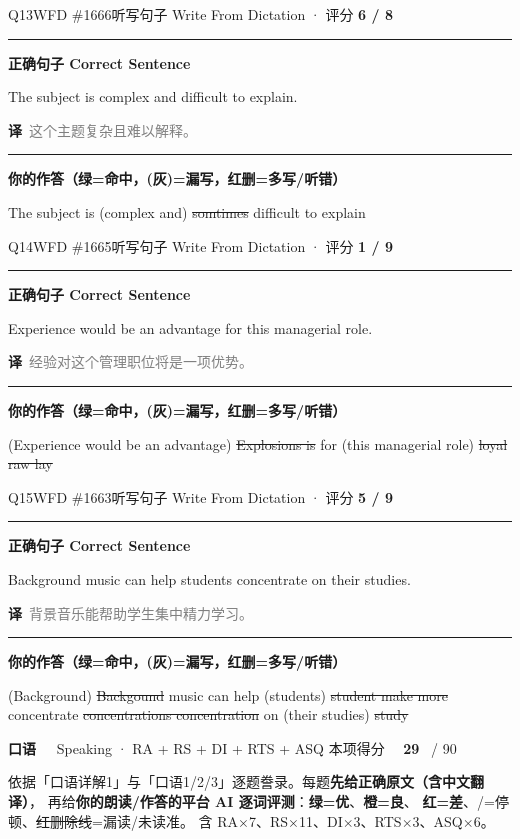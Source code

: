 \documentclass[11pt]{article}
\newcommand{\ptesub}[1]{%
  \par\needspace{2\baselineskip}\smallskip
  {\color{cAccent}\rule[-0.2ex]{3pt}{1.05em}}\hspace{6pt}%
  {\bfseries\color{cHead}#1}\par\nopagebreak\smallskip}
\newcommand{\ptesection}[3]{%
  \addcontentsline{toc}{section}{#1}%
  \needspace{6\baselineskip}
  \begin{tcolorbox}[enhanced, colback=cAccent, colframe=cAccent, sharp corners,
     left=14pt, right=14pt, top=10pt, bottom=10pt, boxrule=0pt]
    {\fontsize{20}{24}\selectfont\bfseries\color{white} #1\ \ }%
    {\large\color{white!85} #2}\hfill
    {\large\color{white}本项得分\ \ }{\fontsize{22}{24}\selectfont\bfseries\color{white} #3}%
    \ {\color{white!85}/ 90}
  \end{tcolorbox}}
\newcommand{\zh}[1]{{\footnotesize\textcolor{cNote}{\textbf{译}}\ \textcolor{gray}{#1}}}
\newcommand{\lhit}[1]{{\color{cFix}#1}}                           %
\newcommand{\lmiss}[1]{{\color{cWrong}\sout{#1}}}                 %
\begin{document}
\begin{qblock}{Q13\quad WFD \#1666}{听写句子 Write From Dictation · 评分 \textcolor{cAccent}{\bfseries 6 / 8}}
\ptesub{正确句子 Correct Sentence}
\begin{promptbox}
The subject is complex and difficult to explain.
\end{promptbox}
\zh{这个主题复杂且难以解释。}
\ptesub{你的作答（{\color{cFix}绿=命中}，{\color{gray}(灰)=漏写}，{\color{cWrong}红删=多写/听错}）}
{\small\lhit{The subject is} {\color{gray}(complex and)} \lmiss{somtimes} \lhit{difficult to explain}}
\end{qblock}

\begin{qblock}{Q14\quad WFD \#1665}{听写句子 Write From Dictation · 评分 \textcolor{cAccent}{\bfseries 1 / 9}}
\ptesub{正确句子 Correct Sentence}
\begin{promptbox}
Experience would be an advantage for this managerial role.
\end{promptbox}
\zh{经验对这个管理职位将是一项优势。}
\ptesub{你的作答（{\color{cFix}绿=命中}，{\color{gray}(灰)=漏写}，{\color{cWrong}红删=多写/听错}）}
{\small{\color{gray}(Experience would be an advantage)} \lmiss{Explosions is} \lhit{for} {\color{gray}(this managerial role)} \lmiss{loyal raw lay}}
\end{qblock}

\begin{qblock}{Q15\quad WFD \#1663}{听写句子 Write From Dictation · 评分 \textcolor{cAccent}{\bfseries 5 / 9}}
\ptesub{正确句子 Correct Sentence}
\begin{promptbox}
Background music can help students concentrate on their studies.
\end{promptbox}
\zh{背景音乐能帮助学生集中精力学习。}
\ptesub{你的作答（{\color{cFix}绿=命中}，{\color{gray}(灰)=漏写}，{\color{cWrong}红删=多写/听错}）}
{\small{\color{gray}(Background)} \lmiss{Backgound} \lhit{music can help} {\color{gray}(students)} \lmiss{student make more} \lhit{concentrate} \lmiss{concentrations concentration} \lhit{on} {\color{gray}(their studies)} \lmiss{study}}
\end{qblock}

\clearpage
\ptesection{口语}{Speaking · RA + RS + DI + RTS + ASQ}{29}

\vspace{1mm}
{\small\color{gray} 依据「口语详解1」与「口语1/2/3」逐题誊录。每题\textbf{先给正确原文（含中文翻译）}，
再给\textbf{你的朗读/作答的平台 AI 逐词评测}：{\color{cSpkGood}\textbf{绿=优}}、{\color{cSpkOk}\textbf{橙=良}}、
{\color{cSpkBad}\textbf{红=差}}、{\color{gray}/=停顿}、{\color{cSpkBad}\sout{红删除线}}=漏读/未读准。
含 RA$\times$7、RS$\times$11、DI$\times$3、RTS$\times$3、ASQ$\times$6。}
\vspace{1mm}
\end{document}

